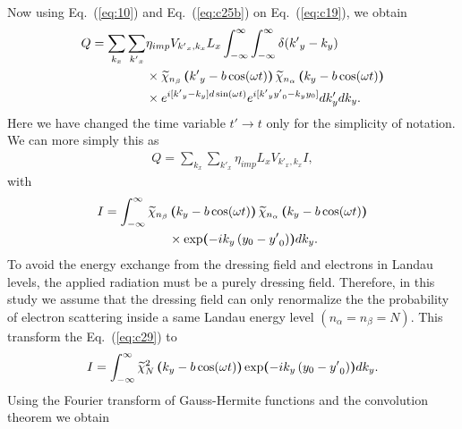 \documentclass[
 reprint,
 amsmath,amssymb,
 aps,
 prb,
]{revtex4-2}
\begin{document}
Now using Eq.~(\ref{eq:10}) and Eq.~(\ref{eq:c25b}) on Eq.~(\ref{eq:c19}), we obtain
\begin{equation} \label{eq:c27}
  \begin{aligned}
    Q  =
    \sum_{k_x}\sum_{{k'}_x} &
    {\eta_{imp} V_{{k'}_x,k_x}} L_x
    \int_{-\infty}^{\infty} \int_{-\infty}^{\infty}
    \delta({k'}_y - k_y)
    \\
    & \times
    \widetilde{\chi}_{n_{\beta}} \bm{\left(} {k'}_y -b\cos(\omega t) \bm{\right)}
    \widetilde{\chi}_{n_{\alpha}}  \bm{\left(}k_y -b\cos(\omega t) \bm{\right)}
    \\
    & \times
    e^{i[{k'}_y - k_y]d\sin(\omega t)}
    e^{i[{k'}_y {y'}_0 - k_y y_0]}
     dk'_y dk_y.
  \end{aligned}
\end{equation}
Here we have changed the time variable $t' \rightarrow t$ only for the simplicity of notation. We can more simply this as
\begin{equation} \label{eq:c28}
  \begin{aligned}
    Q =
    \sum_{k_x}\sum_{{k'}_x} \eta_{imp} L_x V_{{k'}_x,k_x} I,
  \end{aligned}
\end{equation}
with
\begin{equation} \label{eq:c29}
  \begin{aligned}
    I =
    \int_{-\infty}^{\infty}
    \widetilde{\chi}_{n_{\beta}} &\bm{\left(}  k_y -b\cos(\omega t) \bm{\right)}
    \widetilde{\chi}_{n_{\alpha}} \bm{\left(} k_y -b\cos(\omega t) \bm{\right)} \\
    & \times
    \exp \bm{(}
      -ik_y  \left(y_0 - {y'}_0 \right)
    \bm{)} dk_y.
  \end{aligned}
\end{equation}
To avoid the energy exchange from the dressing field and electrons in Landau levels, the applied radiation must be a purely dressing field.
Therefore, in this study we assume that the dressing field can only renormalize the the probability of electron scattering inside a same Landau energy level $(n_{\alpha} = n_{\beta} =N)$. This transform the Eq.~(\ref{eq:c29}) to
\begin{equation} \label{eq:c30}
    I =
    \int_{-\infty}^{\infty}
    \widetilde{\chi}_N^2 \bm{\left(}  k_y -b\cos(\omega t) \bm{\right)}
    \exp \bm{(}
      -ik_y  \left(y_0 - {y'}_0 \right)
    \bm{)} dk_y.
\end{equation}
Using the Fourier transform of Gauss-Hermite functions \cite{celeghini21} and the convolution theorem \cite{arfken85,bracewell78} we obtain
\end{document}

